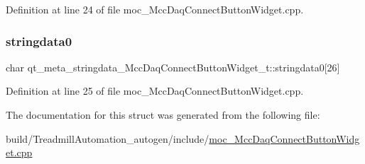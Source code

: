 Definition at line 24 of file moc\+\_\+\+Mcc\+Daq\+Connect\+Button\+Widget.\+cpp.

\mbox{\label{structqt__meta__stringdata___mcc_daq_connect_button_widget__t_ab705b1895a10dbc66443d1e6c0c3e12b}} 
\subsubsection{\texorpdfstring{stringdata0}{stringdata0}}
{\footnotesize\ttfamily char qt\+\_\+meta\+\_\+stringdata\+\_\+\+Mcc\+Daq\+Connect\+Button\+Widget\+\_\+t\+::stringdata0\mbox{[}26\mbox{]}}



Definition at line 25 of file moc\+\_\+\+Mcc\+Daq\+Connect\+Button\+Widget.\+cpp.



The documentation for this struct was generated from the following file\+:\begin{DoxyCompactItemize}
\item 
build/\+Treadmill\+Automation\+\_\+autogen/include/\hyperlink{moc___mcc_daq_connect_button_widget_8cpp}{moc\+\_\+\+Mcc\+Daq\+Connect\+Button\+Widget.\+cpp}\end{DoxyCompactItemize}
